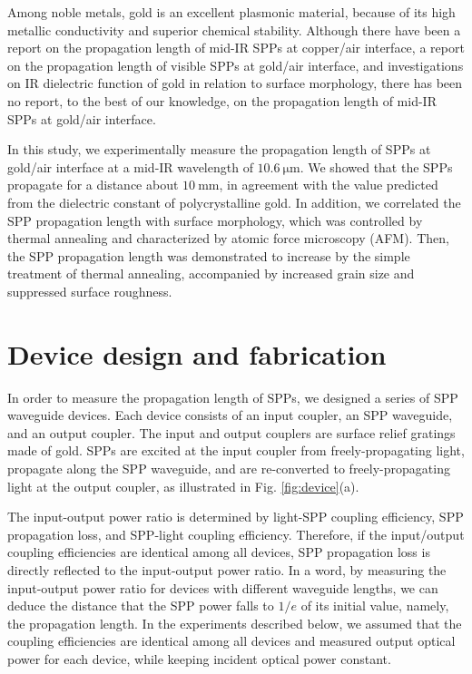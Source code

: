 \documentclass[aip,apl,reprint]{revtex4-1}
\begin{document}
Among noble metals, gold is an excellent plasmonic material, because of its high metallic conductivity and superior chemical stability\cite{Zayats}. Although there have been a report on the propagation length of mid-IR SPPs at copper/air interface\cite{Shiba}, a report on the propagation length of visible SPPs at gold/air interface\cite{Kuttge}, and investigations on IR dielectric function of gold in relation to surface morphology\cite{Trollmann, Olmon}, there has been no report, to the best of our knowledge, on the propagation length of mid-IR SPPs at gold/air interface.

In this study, we experimentally measure the propagation length of SPPs at gold/air interface at a mid-IR wavelength of $10.6\:\mathrm{\mu m}$. We showed that the SPPs propagate for a distance about $10\:\mathrm{mm}$, in agreement with the value predicted from the dielectric constant of polycrystalline gold. In addition, we correlated the SPP propagation length with surface morphology, which was controlled by thermal annealing and characterized by atomic force microscopy (AFM). Then, the SPP propagation length was demonstrated to increase by the simple treatment of thermal annealing, accompanied by increased grain size and suppressed surface roughness.

\section{Device design and fabrication}
\label{sec:device}
In order to measure the propagation length of SPPs, we designed a series of SPP waveguide devices. Each device consists of an input coupler, an SPP waveguide, and an output coupler.  The input and output couplers are surface relief gratings made of gold. SPPs are  excited at the input coupler from freely-propagating light, propagate along the SPP waveguide, and are re-converted to freely-propagating light at the output coupler, as illustrated in Fig. \ref{fig:device}(a). 

The input-output power ratio is determined by light-SPP coupling efficiency, SPP propagation loss, and SPP-light coupling efficiency. Therefore, if the input/output coupling efficiencies are identical among all devices, SPP propagation loss is directly reflected to the input-output power ratio. In a word, by measuring the input-output power ratio for devices with different waveguide lengths, we can deduce the distance that the SPP power falls to $1/e$ of its initial value, namely, the propagation length. In the experiments described below, we assumed that the coupling efficiencies are identical among all devices and measured output optical power for each device, while keeping incident optical power constant. 
\end{document}
